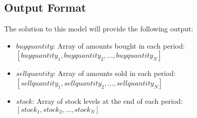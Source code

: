 \documentclass{article}
\begin{document}
\subsection*{Output Format}
The solution to this model will provide the following output:
\begin{itemize}
    \item $buyquantity$: Array of amounts bought in each period: $[buyquantity_1, buyquantity_2, \ldots, buyquantity_N]$
    \item $sellquantity$: Array of amounts sold in each period: $[sellquantity_1, sellquantity_2, \ldots, sellquantity_N]$
    \item $stock$: Array of stock levels at the end of each period: $[stock_1, stock_2, \ldots, stock_N]$
\end{itemize}
\end{document}
